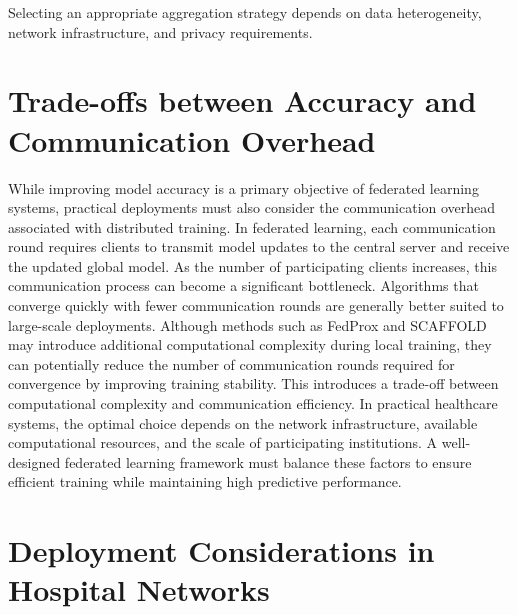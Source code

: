 \documentclass[12pt]{book}
\begin{document}
Selecting an appropriate aggregation strategy depends on data heterogeneity, network infrastructure, and privacy requirements.

\section{Trade-offs between Accuracy and Communication Overhead}

While improving model accuracy is a primary objective of federated learning systems, practical deployments must also consider the communication overhead associated with distributed training. In federated learning, each communication round requires clients to transmit model updates to the central server and receive the updated global model. As the number of participating clients increases, this communication process can become a significant bottleneck.
Algorithms that converge quickly with fewer communication rounds are generally better suited to large-scale deployments. Although methods such as FedProx and SCAFFOLD may introduce additional computational complexity during local training, they can potentially reduce the number of communication rounds required for convergence by improving training stability.
This introduces a trade-off between computational complexity and communication efficiency. In practical healthcare systems, the optimal choice depends on the network infrastructure, available computational resources, and the scale of participating institutions. A well-designed federated learning framework must balance these factors to ensure efficient training while maintaining high predictive performance.

\section{Deployment Considerations in Hospital Networks}
\end{document}
